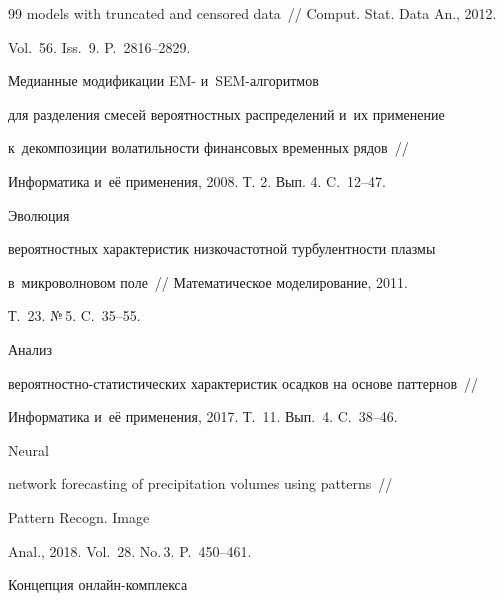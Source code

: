 {{\begin{thebibliography}{99}
models with truncated and censored data~// Comput. Stat. Data An., 2012. 


Vol.~56. Iss.~9. P.~2816--2829.







 Медианные модификации EM- и~SEM-ал\-го\-рит\-мов 


для разделения смесей вероятностных распределений и~их применение 


к~декомпозиции волатильности финансовых временных рядов~/\!\!/ 


Информатика и~её применения, 2008. Т. 2. Вып. 4. C.~12--47. 







  Эволюция 


вероятностных характеристик низкочастотной турбулентности плазмы 


в~микроволновом поле~/\!\!/ Математическое моделирование, 2011.


Т.~23. №\,5. C.~35--55.







 Анализ 


вероятностно-статистических характеристик осадков на основе паттернов~/\!\!/ 


Информатика и~её применения, 2017. Т.~11. Вып.~4. C.~38--46.







 Neural


network forecasting of precipitation volumes using patterns~/\!\!/ 


Pattern Recogn. Image 


Anal., 2018. Vol.~28. No.\,3. P.~450--461.







 Концепция онлайн-комплекса 



\end{thebibliography}}}
